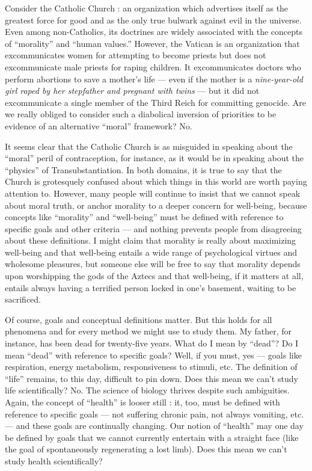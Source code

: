 \documentclass[a4paper,14pt]{extarticle}
\begin{document}
Consider the Catholic Church :
an organization which advertises itself as the greatest force for good and as the only true bulwark against evil in the universe.
Even among non-Catholics, its doctrines are widely associated with the concepts of ``morality'' and ``human values.''
However, the Vatican is an organization that excommunicates women for attempting to become priests but does not excommunicate male priests for raping children.
It excommunicates doctors who perform abortions to save a mother's life --- even if the mother is a \textit{nine-year-old girl raped by her stepfather and pregnant with twins} --- but it did not excommunicate a single member of the Third Reich for committing genocide.
Are we really obliged to consider such a diabolical inversion of priorities to be evidence of an alternative ``moral'' framework?
No.

It seems clear that the Catholic Church is as misguided in speaking about the ``moral'' peril of contraception, for instance, as it would be in speaking about the ``physics'' of Transubstantiation.
In both domains, it is true to say that the Church is grotesquely confused about which things in this world are worth paying attention to.
However, many people will continue to insist that we cannot speak about moral truth, or anchor morality to a deeper concern for well-being, because concepts like ``morality'' and ``well-being'' must be defined with reference to specific goals and other criteria --- and nothing prevents people from disagreeing about these definitions.
I might claim that morality is really about maximizing well-being and that well-being entails a wide range of psychological virtues and wholesome pleasures, but someone else will be free to say that morality depends upon worshipping the gods of the Aztecs and that well-being, if it matters at all, entails always having a terrified person locked in one's basement, waiting to be sacrificed.

Of course, goals and conceptual definitions matter.
But this holds for all phenomena and for every method we might use to study them.
My father, for instance, has been dead for twenty-five years.
What do I mean by ``dead''?
Do I mean ``dead'' with reference to specific goals?
Well, if you must, yes --- goals like respiration, energy metabolism, responsiveness to stimuli, etc.
The definition of ``life'' remains, to this day, difficult to pin down.
Does this mean we can't study life scientifically?
No.
The science of biology thrives despite such ambiguities.
Again, the concept of ``health'' is looser still :
it, too, must be defined with reference to specific goals --- not suffering chronic pain, not always vomiting, etc. --- and these goals are continually changing.
Our notion of ``health'' may one day be defined by goals that we cannot currently entertain with a straight face (like the goal of spontaneously regenerating a lost limb).
Does this mean we can't study health scientifically?
\end{document}
